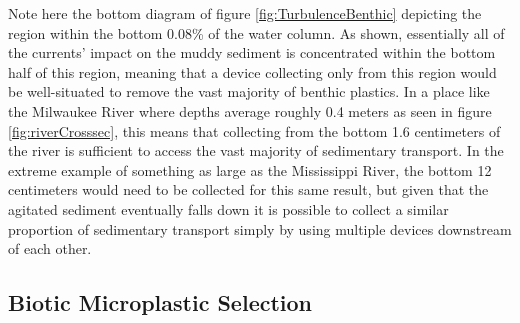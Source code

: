 \documentclass[fleqn,10pt]{SelfArx} %
\begin{document}
	Note here the bottom diagram of figure \ref{fig:TurbulenceBenthic} depicting the region within the bottom 0.08\% of the water column. As shown, essentially all of the currents’ impact on the muddy sediment is concentrated within the bottom half of this region, meaning that a device collecting only from this region would be well-situated to remove the vast majority of \gls{benthic} plastics. In a place like the Milwaukee River where depths average roughly 0.4 meters as seen in figure \ref{fig:riverCrosssec}, this means that collecting from the bottom 1.6 centimeters of the river is sufficient to access the vast majority of sedimentary transport. In the extreme example of something as large as the Mississippi River, the bottom 12 centimeters would need to be collected for this same result, but given that the agitated sediment eventually falls down it is possible to collect a similar proportion of sedimentary transport simply by using multiple devices downstream of each other.
	
	
	\subsection{Biotic Microplastic Selection}
	
\end{document}
